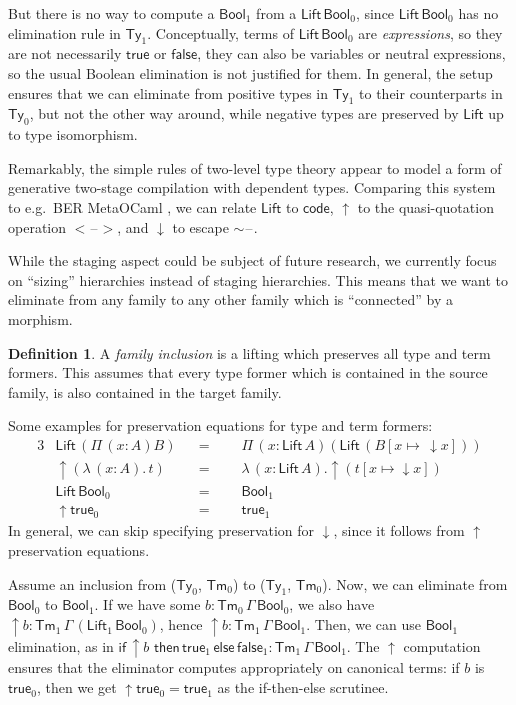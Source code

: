\documentclass[a4paper,UKenglish,cleveref, autoref, thm-restate]{lipics-v2021}
\theoremstyle{remark}
\theoremstyle{definition}
\newtheorem{mydefinition}{Definition}
\newcommand{\Ty}{\mathsf{Ty}}
\newcommand{\Tm}{\mathsf{Tm}}
\newcommand{\blank}{\mathord{\hspace{1pt}\text{--}\hspace{1pt}}}
\newcommand{\Bool}{\mathsf{Bool}}
\newcommand{\true}{\mathsf{true}}
\newcommand{\false}{\mathsf{false}}
\newcommand{\up}{\uparrow}
\newcommand{\down}{\downarrow}
\newcommand{\Lift}{\mathsf{Lift}}
\begin{document}
But there is no way to compute a $\Bool_1$ from a $\Lift\,\Bool_0$, since
$\Lift\,\Bool_0$ has no elimination rule in $\Ty_1$. Conceptually, terms
of $\Lift\,\Bool_0$ are \emph{expressions}, so they are not necessarily $\true$ or
$\false$, they can also be variables or neutral expressions, so the usual
Boolean elimination is not justified for them. In general, the setup ensures that
we can eliminate from positive types in $\Ty_1$ to their counterparts in
$\Ty_0$, but not the other way around, while negative types are preserved by
$\Lift$ up to type isomorphism.

Remarkably, the simple rules of two-level type theory appear to model a form of
generative two-stage compilation with dependent types. Comparing this system to
e.g.\ BER MetaOCaml \cite{kiselyov14metaocaml}, we can relate $\Lift$ to $\mathsf{code}$, $\up$
to the quasi-quotation operation $<\!\blank\!>$, and $\down$ to escape
$\sim\!\blank$.

While the staging aspect could be subject of future research, we currently focus
on ``sizing'' hierarchies instead of staging hierarchies. This means that we
want to eliminate from any family to any other family which is ``connected'' by
a morphism.

\begin{mydefinition}\label{def:inclusion}
A \emph{family inclusion} is a lifting which preserves all type and term
formers. This assumes that every type former which is contained in the source
family, is also contained in the target family.
\end{mydefinition}

\noindent Some examples for preservation equations for type and term formers:
\begin{alignat*}{3}
  & \Lift\,(\Pi\,(x : A) B)   && =\,\,\,\,&& \Pi\,(x : \Lift\,A)(\Lift\, (B[x \mapsto\,\down\!x]))\\
  & \up(\lambda\,(x : A).\,t) && =&& \lambda\,(x : \Lift\,A).\up(t[x\mapsto\down\!x])\\
  & \Lift\,\Bool_0            && =&& \Bool_1\\
  & \up\true_0                && =&& \true_1
\end{alignat*}
In general, we can skip specifying preservation for $\down$, since it follows from $\up$ preservation
equations.

Assume an inclusion from ($\Ty_0$, $\Tm_0$) to ($\Ty_1$, $\Tm_0$). Now, we can
eliminate from $\Bool_0$ to $\Bool_1$. If we have some $b :
\Tm_0\,\Gamma\,\Bool_0$, we also have $\up\!b :
\Tm_1\,\Gamma\,(\Lift_1\,\Bool_0)$, hence $\up\!b :
\Tm_1\,\Gamma\,\Bool_1$. Then, we can use $\Bool_1$ elimination, as in
$\mathsf{if}\,\up\!b\,\,\mathsf{then}\,\true_1\,\mathsf{else}\,\false_1 :
\Tm_1\,\Gamma\,\Bool_1$. The $\up$ computation ensures that the eliminator
computes appropriately on canonical terms: if $b$ is $\true_0$, then we get
$\up\!\true_0 = \true_1$ as the if-then-else scrutinee.
\end{document}
